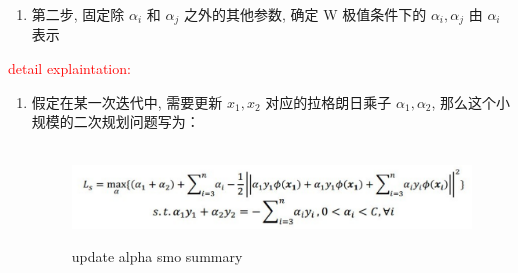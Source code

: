 \documentclass[oneside, 12pt]{ctexbook}
\begin{document}
\begin{enumerate}
\begin{enumerate}[(1)]
\begin{enumerate}
									\item 第二步, 固定除 $\alpha_i$ 和 $\alpha_j$ 之外的其他参数, 确定 W 极值条件下的 $\alpha_i, \alpha_j$ 由 $\alpha_i$ 表示
								\end{enumerate}
							
								\textcolor{red}{detail explaintation:}
								 \begin{enumerate}
								 	\item 假定在某一次迭代中, 需要更新 $x_1, x_2$ 对应的拉格朗日乘子 $\alpha_1, \alpha_2$, 那么这个小规模的二次规划问题写为：
									 	\begin{figure}[H]
									 		\vspace{-0.2cm}  %
									 		\setlength{\abovecaptionskip}{-0.2cm}   %
									 		\centering
									 		\includegraphics[scale=0.5]{update_alpha_smo_summary.png}
									 		\renewcommand{\figurename}{Fig} %
									 		\caption{update alpha smo summary}
									 		\label{update_alpha_smo_summary}
									 	\end{figure}


\end{enumerate}
\end{enumerate}
\end{enumerate}
\end{document}
